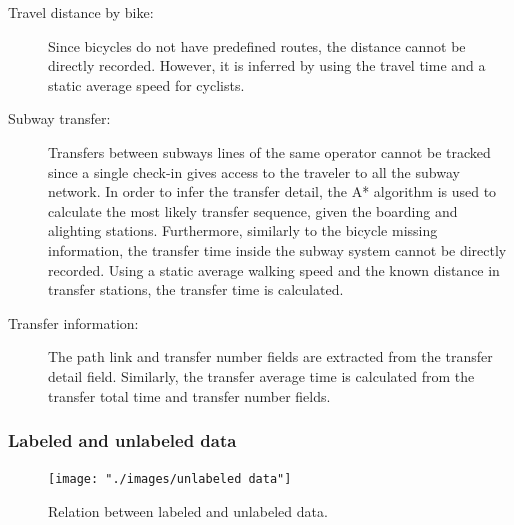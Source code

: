 \documentclass{article}
\begin{document}
\begin{description}%
\item[Travel distance by bike:] Since bicycles do not have predefined routes, the distance cannot be directly recorded. However, it is inferred by using the travel time and a static average speed for cyclists. 

\item[Subway transfer:] Transfers between subways lines of the same operator cannot be tracked since a single check-in gives access to the traveler to all the subway network. In order to infer the transfer detail, the A* algorithm is used to calculate the most likely transfer sequence, given the boarding and alighting stations. 
Furthermore, similarly to the bicycle missing information, the transfer time inside the subway system cannot be directly recorded. Using a static average walking speed and the known distance in transfer stations, the transfer time is calculated. 

\item[Transfer information:] The path link and transfer number fields are extracted from the transfer detail field. Similarly, the transfer average time is calculated from the transfer total time and transfer number fields. 
\end{description}


\subsubsection{Labeled and unlabeled data}
\label{sec:datasets}

\begin{figure}[h]
  \centering
  \texttt{[image: "./images/unlabeled data"]} %
  \caption{Relation between labeled and unlabeled data.}
  \label{fig:method/unlabeled}
\end{figure}
\end{document}
